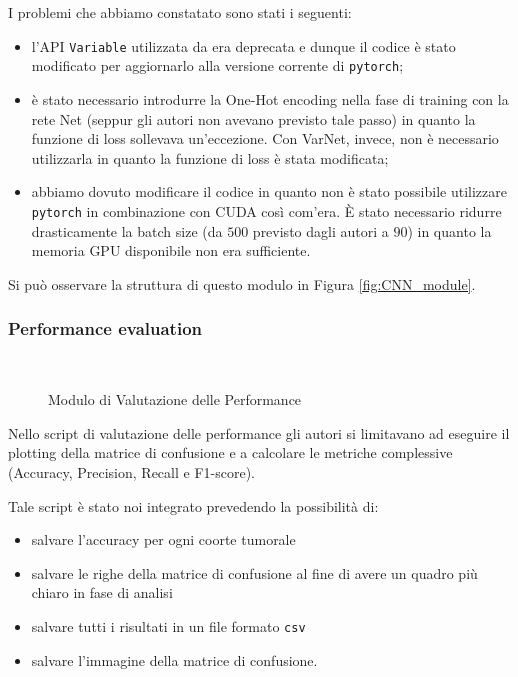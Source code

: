 I problemi che abbiamo constatato sono stati i seguenti:
\begin{itemize}
	\item l'API \texttt{Variable} utilizzata da \cite{lyu2018deep} era deprecata e dunque il codice è stato modificato 
		   per aggiornarlo alla versione corrente di \texttt{pytorch};
	\item è stato necessario introdurre la One-Hot encoding nella fase di training con la rete Net 
          (seppur gli autori non avevano previsto tale passo) in quanto la funzione di loss sollevava un'eccezione. 
          Con VarNet, invece, non è necessario utilizzarla in quanto la funzione di loss è stata modificata;
	\item abbiamo dovuto modificare il codice in quanto non è stato possibile utilizzare \texttt{pytorch} 
          in combinazione con CUDA così com'era.
		   È stato necessario ridurre drasticamente la batch size (da $500$ previsto dagli autori a $90$) in quanto 
          la memoria GPU disponibile non era sufficiente.
\end{itemize}
Si può osservare la struttura di questo modulo in Figura \ref{fig:CNN_module}.

\subsubsection{Performance evaluation} ~ \newline
\begin{figure}[hbpt!]
		\centering
		
  		\caption{Modulo di Valutazione delle Performance}
        \label{fig:Model_Evaluation}
\end{figure}
Nello script di valutazione delle performance gli autori si limitavano ad eseguire il plotting della matrice 
di confusione e a calcolare le metriche complessive (Accuracy, Precision, Recall e F1-score).

Tale script è stato noi integrato prevedendo la possibilità di: 
\begin{itemize}
    \item salvare l'accuracy per ogni coorte tumorale
    \item salvare le righe della matrice di confusione al fine di avere un quadro più chiaro in fase di analisi
    \item salvare tutti i risultati in un file formato \texttt{csv}
    \item salvare l'immagine della matrice di confusione.
\end{itemize}

